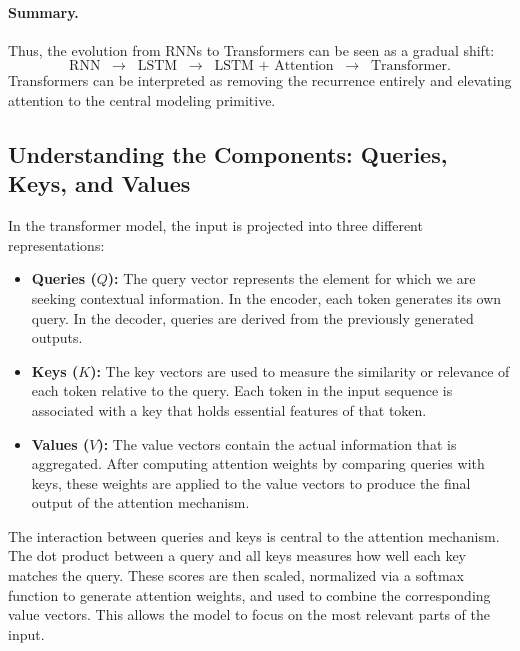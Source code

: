 \documentclass[11pt]{article}
\theoremstyle{remark}
\begin{document}
\paragraph{Summary.}
Thus, the evolution from RNNs to Transformers can be seen as a gradual shift:
\[
\text{RNN} \;\;\longrightarrow\;\; \text{LSTM} \;\;\longrightarrow\;\; \text{LSTM + Attention} \;\;\longrightarrow\;\; \text{Transformer}.
\]
Transformers can be interpreted as removing the recurrence entirely and elevating attention to the central modeling primitive.

\subsection{Understanding the Components: Queries, Keys, and Values}

In the transformer model, the input is projected into three different representations:
\begin{itemize}[noitemsep]
    \item \textbf{Queries (\(Q\)):} The query vector represents the element for which we are seeking contextual information. In the encoder, each token generates its own query. In the decoder, queries are derived from the previously generated outputs.
    \item \textbf{Keys (\(K\)):} The key vectors are used to measure the similarity or relevance of each token relative to the query. Each token in the input sequence is associated with a key that holds essential features of that token.
    \item \textbf{Values (\(V\)):} The value vectors contain the actual information that is aggregated. After computing attention weights by comparing queries with keys, these weights are applied to the value vectors to produce the final output of the attention mechanism.
\end{itemize}

The interaction between queries and keys is central to the attention mechanism. The dot product between a query and all keys measures how well each key matches the query. These scores are then scaled, normalized via a softmax function to generate attention weights, and used to combine the corresponding value vectors. This allows the model to focus on the most relevant parts of the input.
\end{document}
